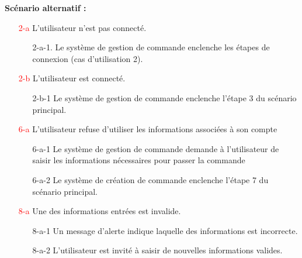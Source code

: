 \documentclass[16pt]{report}
\begin{document}
\textbf{Scénario alternatif :}
\begin{enumerate}[leftmargin=4em]
    \item[\textcolor{red}{2-a}] L’utilisateur n’est pas connecté.
            \begin{enumerate}
        \item[2-a-1.] Le système de gestion de commande enclenche les étapes de connexion (cas d’utilisation 2).
             \end{enumerate}
         \item[\textcolor{red}{2-b}] L’utilisateur est connecté.
            \begin{enumerate}
            \item[2-b-1] Le système de gestion de commande enclenche l’étape 3 du scénario principal.
            \end{enumerate}
        \item[\textcolor{red}{6-a}] L’utilisateur refuse d’utiliser les informations associées à son compte
            \begin{enumerate}
            \item[6-a-1] Le système de gestion de commande demande à l’utilisateur de saisir les 	informations nécessaires pour passer la commande 
            \item[6-a-2] Le système de création de commande enclenche l’étape 7 du scénario principal. 
            \end{enumerate}

        \item[\textcolor{red}{8-a}] Une des informations entrées est invalide.
            \begin{enumerate}
            \item[8-a-1] Un message d’alerte indique laquelle des informations est incorrecte.
            \item[8-a-2] L’utilisateur est invité à saisir de nouvelles informations valides. 
             \end{enumerate} 


\end{enumerate}
\end{document}
